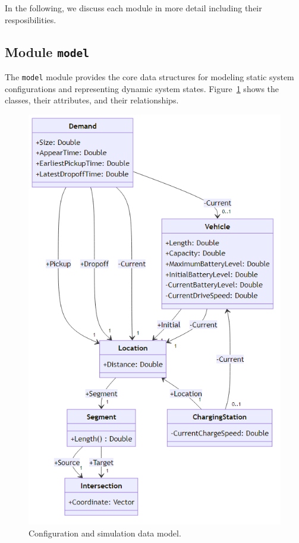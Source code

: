 \documentclass[10pt,twocolumn]{article}
\begin{document}
In the following, we discuss each module in more detail including their resposibilities.

\subsection{Module \texttt{model}}
\label{sec:data-model}

The \texttt{model} module provides the core data structures for modeling static system configurations and representing dynamic system states.
Figure~\ref{fig:data-model} shows the classes, their attributes, and their relationships.

\begin{figure}[h!]
    \centering
    \includegraphics[scale=0.4]{../../diagrams/model/classes-v0.2.png}
    \caption{Configuration and simulation data model.}
    \label{fig:data-model}
\end{figure}
\end{document}
